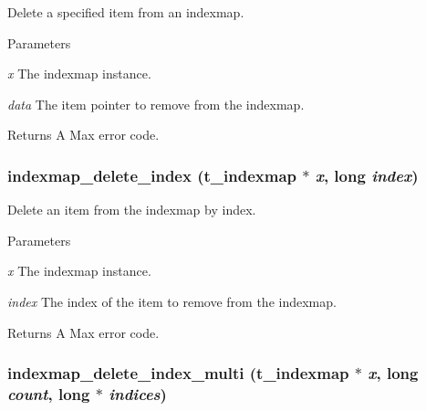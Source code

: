 Delete a specified item from an indexmap. 
\begin{DoxyParams}{Parameters}
\item[{\em x}]The indexmap instance. \item[{\em data}]The item pointer to remove from the indexmap. \end{DoxyParams}
\begin{DoxyReturn}{Returns}
A Max error code. 
\end{DoxyReturn}
\hypertarget{group__indexmap_ga7d0117753b9ed42f977b63ab62603f71}{
\subsubsection[{indexmap\_\-delete\_\-index}]{ indexmap\_\-delete\_\-index ({\bf t\_\-indexmap} $\ast$ {\em x}, \/  long {\em index})}}
\label{group__indexmap_ga7d0117753b9ed42f977b63ab62603f71}


Delete an item from the indexmap by index. 
\begin{DoxyParams}{Parameters}
\item[{\em x}]The indexmap instance. \item[{\em index}]The index of the item to remove from the indexmap. \end{DoxyParams}
\begin{DoxyReturn}{Returns}
A Max error code. 
\end{DoxyReturn}
\hypertarget{group__indexmap_gad626671799012e2da71476fd99bdec67}{
\subsubsection[{indexmap\_\-delete\_\-index\_\-multi}]{ indexmap\_\-delete\_\-index\_\-multi ({\bf t\_\-indexmap} $\ast$ {\em x}, \/  long {\em count}, \/  long $\ast$ {\em indices})}}
\label{group__indexmap_gad626671799012e2da71476fd99bdec67}


